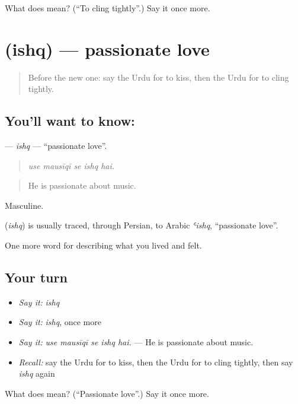 \begin{tcolorbox}[breakable,colback=teal!4,colframe=teal!35!black,title={Before you move on}]
What does  mean? (\textquotedblleft{}To cling tightly\textquotedblright{}.) Say it once more.
\end{tcolorbox}
\section[\texorpdfstring{\ur{عشق} (ishq)}{عشق (ishq)}]{ (ishq) — passionate love}

\label{lesson:UR-C449-ishq}



\begin{quote}
Before the new one: say the Urdu for to kiss, then the Urdu for to cling tightly.
\end{quote}

\subsection*{You'll want to know: }
\textbf{} — \emph{ishq} — \textquotedblleft{}passionate love\textquotedblright{}.

\begin{quote}
    
\end{quote}

\begin{quote}
\emph{use mausīqī se ishq hai.}
\end{quote}

\begin{quote}
He is passionate about music.
\end{quote}

Masculine.

\begin{cousinweb}
\textbf{} (\emph{ishq}) is usually traced, through Persian, to Arabic \emph{ʿishq}, \textquotedblleft{}passionate love\textquotedblright{}.
\end{cousinweb}

\begin{grammarlens}[title={What you've built}]
One more word for describing what you lived and felt.
\end{grammarlens}

\subsection*{Your turn}
\begin{itemize}
\raggedright
  \item \emph{Say it:} \emph{ishq}
  \item \emph{Say it:} \emph{ishq}, once more
  \item \emph{Say it:} \emph{use mausīqī se ishq hai.} — He is passionate about music.
  \item \emph{Recall:} say the Urdu for to kiss, then the Urdu for to cling tightly, then say \emph{ishq} again
\end{itemize}

\begin{tcolorbox}[breakable,colback=teal!4,colframe=teal!35!black,title={Before you move on}]
What does  mean? (\textquotedblleft{}Passionate love\textquotedblright{}.) Say it once more.
\end{tcolorbox}

